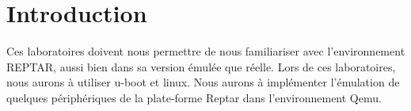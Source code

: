 
\chapter{Introduction} %

\label{Chapitre 1} %


Ces laboratoires doivent nous permettre de nous familiariser avec l'environnement REPTAR, aussi bien dans sa version émulée que réelle. Lors de ces laboratoires, nous aurons à utiliser u-boot et linux. Nous aurons à implémenter l’émulation de quelques périphériques de la plate-forme Reptar dans l'environnement Qemu.


























